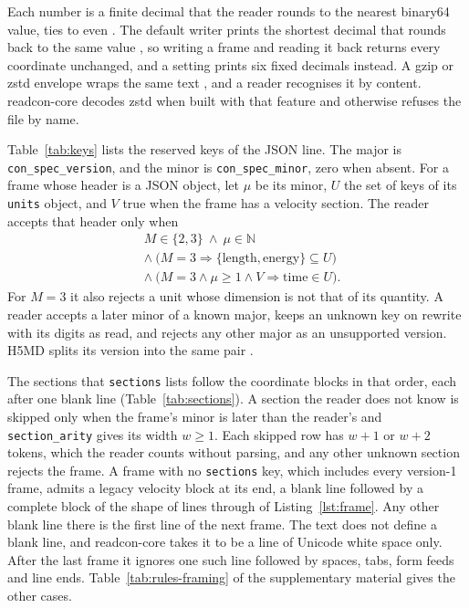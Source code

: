 Each number is a finite decimal that the reader rounds to the nearest
binary64 value, ties to even
\cite{ieeecomputersocietyIeeeStandardFloatingpoint2019,clingerHowReadFloating1990,lemireNumberParsingGigabytes2021}.
The default writer prints the shortest decimal that rounds back to the
same value
\cite{steeleHowPrintFloatingpoint1990,loitschPrintingFloatingpointNumbers2010,andryscoPrintingFloatingpointNumbers2016,adamsRyFastFloattostring2018},
so writing a frame and reading it back returns every coordinate
unchanged, and a setting prints six fixed decimals instead.
A gzip or zstd envelope wraps the same text
\cite{deutschGzipFileFormat1996,colletZstandardCompressionApplicationzstd2021},
and a reader recognises it by content.
readcon-core decodes zstd when built with that feature and otherwise
refuses the file by name.

Table~\ref{tab:keys} lists the reserved keys of the JSON line.
The major is \texttt{con\_spec\_version}, and the minor is
\texttt{con\_spec\_minor}, zero when absent.
For a frame whose header is a JSON object, let \(\mu\) be its minor,
\(U\) the set of keys of its \texttt{units} object, and \(V\) true when
the frame has a velocity section.
The reader accepts that header only when
\begin{equation}
\label{eq:version}
\begin{aligned}
&M\in\{2,3\}\ \wedge\ \mu\in\mathbb{N}\\
&\wedge\ \bigl(M=3\Rightarrow\{\mathrm{length},\mathrm{energy}\}\subseteq U\bigr)\\
&\wedge\ \bigl(M=3\wedge\mu\ge1\wedge V\Rightarrow \mathrm{time}\in U\bigr).
\end{aligned}
\end{equation}
For \(M=3\) it also rejects a unit whose dimension is not that of its
quantity.
A reader accepts a later minor of a known major, keeps an unknown key on
rewrite with its digits as read, and rejects any other major as an
unsupported version.
H5MD splits its version into the same pair
\cite{buylH5mdStructuredEfficient2014}.


The sections that \texttt{sections} lists follow the coordinate blocks
in that order, each after one blank line (Table~\ref{tab:sections}).
A section the reader does not know is skipped only when the frame's
minor is later than the reader's and \texttt{section\_arity} gives its
width \(w\ge1\).
Each skipped row has \(w+1\) or \(w+2\) tokens, which the reader counts
without parsing, and any other unknown section rejects the frame.
A frame with no \texttt{sections} key, which includes every version-1
frame, admits a legacy velocity block at its end, a blank line followed
by a complete block of the shape of lines \wkLineVelocitySymbol{}
through \wkLineLastVelocity{} of Listing~\ref{lst:frame}.
Any other blank line there is the first line of the next frame.
The text does not define a blank line, and readcon-core takes it to be a
line of Unicode white space only.
After the last frame it ignores one such line followed by spaces, tabs,
form feeds and line ends.
Table~\ref*{tab:rules-framing} of the supplementary material gives the
other cases.


